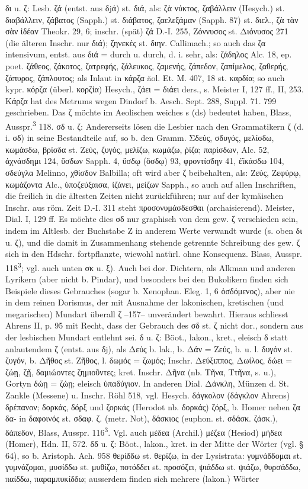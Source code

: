 δι u. ζ: Lesb. ζά (entst. aus δjά) st. διά, als: ζὰ νύκτος, ζαβάλλειν (Hesych.) st. διαβάλλειν, ζάβατος (Sapph.) st. διάβατος, ζαελεξάμαν (Sapph. 87) st. διελ., ζὰ τὰν σὰν ἰδέαν Theokr. 29, 6; inschr. (spät) ζά D.-I. 255, Ζόννυσος st. Διόνυσος 271 (die älteren Inschr. nur διά); ζηνεκές st. διην. Callimach.; so auch das ζα intensivum, entst. aus διά = durch u. durch, d. i. sehr, als: ζάδηλος Alc. 18, ep. poet. ζάθεος, ζάκοτος, ζατρεφής, ζάλευκος, ζαμενής, ζάπεδον, ζαπίμελος, ζαθερής, ζάπυρος, ζάπλουτος; als Inlaut in κάρζα äol. Et. M. 407, 18 st. καρδία; so auch kypr. κόρζα (überl. κορζία) Hesych., ζάει = διάει ders., s. Meister I, 127 ff., II, 253. Κάρζα hat des Metrums wegen Dindorf b. Aesch. Sept. 288, Suppl. 71. 799 geschrieben. Das ζ möchte im Aeolischen weiches s (ds) bedeutet haben, Blass, Ausspr.\textsuperscript{3} 118. σδ u. ζ: Andererseits lösen die Lesbier nach den Grammatikern ζ (d. i. σδ) in seine Bestandteile auf, so b. den Gramm. Σδεύς, σδυγός, μελίσδω, κωμάσδω, βρίσδα st. Ζεύς, ζυγός, μελίζω, κωμάζω, ῥίζα; παρίσδων, Alc. 52, ἀχνάσδημι 124, ὔσδων Sapph. 4, ὔσδῳ (ὄσδῳ) 93, φροντίσδην 41, ἐϊκάσδω 104, σδεύγλα Melinno, χθίσδον Balbilla; oft wird aber ζ beibehalten, als: Ζεύς, Ζεφύρῳ, κωμάζοντα Alc., ὑποζεύξαισα, ἰζάνει, μείζων Sapph., so auch auf allen Inschriften, die freilich in die ältesten Zeiten nicht zurückführen; nur auf der kymäischen Inschr. aus röm. Zeit D.-I. 311 steht προσονυμάσδεσθαι (archaisierend). Meister, Dial. I, 129 ff. Es möchte dies σδ nur graphisch von dem gew. ζ verschieden sein, indem im Altlesb. der Buchstabe Z in anderem Werte verwandt wurde (s. oben δι u. ζ), und die damit in Zusammenhang stehende getrennte Schreibung des gew. ζ sich in den Hdschr. fortpflanzte, wiewohl natürl. ohne Konsequenz. Blass, Ausspr. 118\textsuperscript{3}; vgl. auch unten σκ u. ξ). Auch bei dor. Dichtern, als Alkman und anderen Lyrikern (aber nicht b. Pindar), und besonders bei den Bukolikern finden sich Beispiele dieses Gebrauches (sogar b. Xenophan. Eleg. 1, 6 ὀσδόμενος), aber nie in dem reinen Dorismus, der mit Ausnahme der lakonischen, kretischen (und megarischen) Mundart überall ζ --157-- unverändert bewahrt. Hieraus schliesst Ahrens II, p. 95 mit Recht, dass der Gebrauch des σδ st. ζ nicht dor., sondern aus der lesbischen Mundart entlehnt sei. δ u. ζ: Böot., lakon., kret., eleisch δ statt anlautendem ζ (entst. aus δj), als Δεύς b. lak., b. Δάν = Ζεύς, b. u. l. δυγόν st. ζυγόν, b. Δῆθος st. Ζῆθος, l. δωμός = ζωμός;  Inschr. Δεύξιππος, Δωίλος, δώει = ζώῃ, ζῇ, δαμιώοντες ζημιοῦντες; kret. Inschr. Δῆνα (nb. Τῆνα, Ττῆνα, s. u.), Gortyn δώῃ = ζώῃ; eleisch ὐπαδύγιον. In anderen Dial. Δάνκλη, Münzen d. St. Zankle (Messene) u. Inschr. Röhl 518, vgl. Hesych. δάγκολον (δάγκλον Ahrens) δρέπανον; δορκάς, δόρξ und ζορκάς (Herodot nb. δορκάς) ζόρξ, b. Homer neben ζα δα- in δαφοινός st. σδαφ. ζ. (metr. Not), δάσκιος (euphon. st. σδάσκ. ζάσκ.), δάπεδον, Blass, Ausspr. 116\textsuperscript{3}. Vgl. auch μέδεα (Archil.) μέζεα (Hesiod) μήδεα (Homer), Hdn. II, 572. δδ u. ζ: Böot., lakon., kret. in der Mitte der Wörter (vgl. § 64), so b. Aristoph. Ach. 958 θερίδδω st. θερίζω, in der Lysistrata: γυμνάδδομαι st. γυμνάζομαι, μυσίδδω st. μυθίζω, ποτόδδει st. προσόζει, ψιάδδω st. ψιάζω, θυρσάδδω, παίδδω, παραμπυκίδδω; ausserdem finden sich mehrere (lakon.) Wörter 